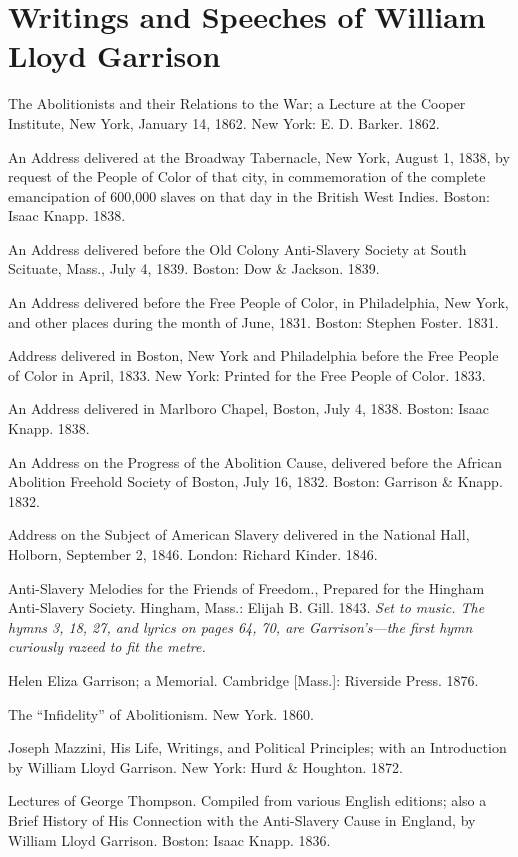 \documentclass{book}
\begin{document}
\section{Writings and Speeches of William Lloyd Garrison}
The Abolitionists and their Relations to the War; a Lecture at the Cooper Institute, New York, January 14, 1862. New York: E. D. Barker. 1862.

An Address delivered at the Broadway Tabernacle, New York, August 1, 1838, by request of the People of Color of that city, in commemoration of the complete emancipation of 600,000 slaves on that day in the British West Indies. Boston: Isaac Knapp. 1838.

An Address delivered before the Old Colony Anti-Slavery Society at South Scituate, Mass., July 4, 1839. Boston: Dow \& Jackson. 1839.

An Address delivered before the Free People of Color, in Philadelphia, New York, and other places during the month of June, 1831. Boston: Stephen Foster. 1831.

Address delivered in Boston, New York and Philadelphia before the Free People of Color in April, 1833. New York: Printed for the Free People of Color. 1833.

An Address delivered in Marlboro Chapel, Boston, July 4, 1838. Boston: Isaac Knapp. 1838.

An Address on the Progress of the Abolition Cause, delivered before the African Abolition Freehold Society of Boston, July 16, 1832. Boston: Garrison \& Knapp. 1832.

Address on the Subject of American Slavery delivered in the National Hall, Holborn, September 2, 1846. London: Richard Kinder. 1846.

Anti-Slavery Melodies for the Friends of Freedom., Prepared for the Hingham Anti-Slavery Society. Hingham, Mass.: Elijah B. Gill. 1843. \emph{Set to music. The hymns 3, 18, 27, and lyrics on pages 64, 70, are Garrison’s—the first hymn curiously razeed to fit the metre.}

Helen Eliza Garrison; a Memorial. Cambridge {[}Mass.{]}: Riverside Press. 1876.

The “Infidelity” of Abolitionism. New York. 1860.

Joseph Mazzini, His Life, Writings, and Political Principles; with an Introduction by William Lloyd Garrison. New York: Hurd \& Houghton. 1872.

Lectures of George Thompson. Compiled from various English editions; also a Brief History of His Connection with the Anti-Slavery Cause in England, by William Lloyd Garrison. Boston: Isaac Knapp. 1836.
\end{document}
